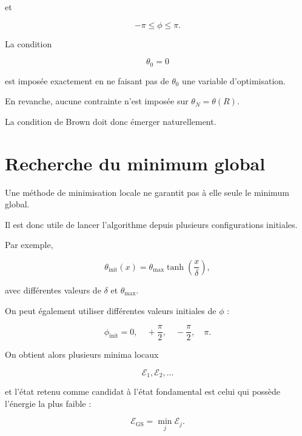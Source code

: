 \documentclass[a4paper,11pt]{article}
\begin{document}
et

\begin{equation}
-\pi\leq\phi\leq\pi.
\end{equation}

La condition

\begin{equation}
\theta_0=0
\end{equation}

est imposée exactement en ne faisant pas de $\theta_0$ une variable
d'optimisation.

En revanche, aucune contrainte n'est imposée sur $\theta_N=\theta(R)$.

La condition de Brown doit donc émerger naturellement.

\section{Recherche du minimum global}

Une méthode de minimisation locale ne garantit pas à elle seule le
minimum global.

Il est donc utile de lancer l'algorithme depuis plusieurs configurations
initiales.

Par exemple,

\begin{equation}
\theta_{\mathrm{init}}(x)
=
\theta_{\max}
\tanh\left(\frac{x}{\delta}\right),
\end{equation}

avec différentes valeurs de $\delta$ et $\theta_{\max}$.

On peut également utiliser différentes valeurs initiales de $\phi$ :

\begin{equation}
\phi_{\mathrm{init}}
=
0,
\quad
+\frac{\pi}{2},
\quad
-\frac{\pi}{2},
\quad
\pi.
\end{equation}

On obtient alors plusieurs minima locaux

\begin{equation}
\mathcal E_1,
\mathcal E_2,\ldots
\end{equation}

et l'état retenu comme candidat à l'état fondamental est celui qui possède
l'énergie la plus faible :

\begin{equation}
\boxed{
\mathcal E_{\mathrm{GS}}
=
\min_j\mathcal E_j.
}
\end{equation}
\end{document}
